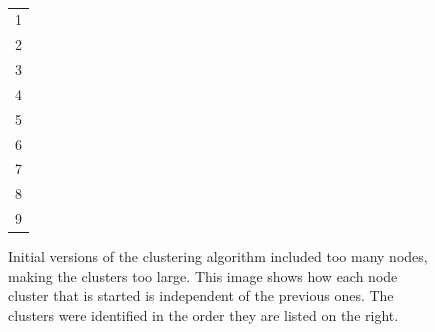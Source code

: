 
\begin{figure}[tbhp]
	\centering
	\begin{minipage}[c]{7cm}
	\end{minipage}%
	\,
	\begin{minipage}[c]{1cm}
		\centering
		\begin{tabular}[b]{l}
			\cellcolor{lyellow}1 \\
			\cellcolor{lorange}2 \\
			\cellcolor{lbrown}3 \\
			\cellcolor{lgreen}4 \\
			\cellcolor{lblue}5 \\
			\cellcolor{lpurple}6 \\
			\cellcolor{lred}7 \\
			\cellcolor{silver}8 \\
			\cellcolor{lgrey}9 \\
		\end{tabular}
	\end{minipage}

	\caption[Propagation of multiple starting locations.]{Initial versions of
		the clustering algorithm included too many nodes, making the clusters
		too large. This image shows how each node cluster that is started is
		independent of the previous ones. The clusters were identified in the
		order they are listed on the right.}\label{fig:multiple-clusters-colours}
\end{figure}

